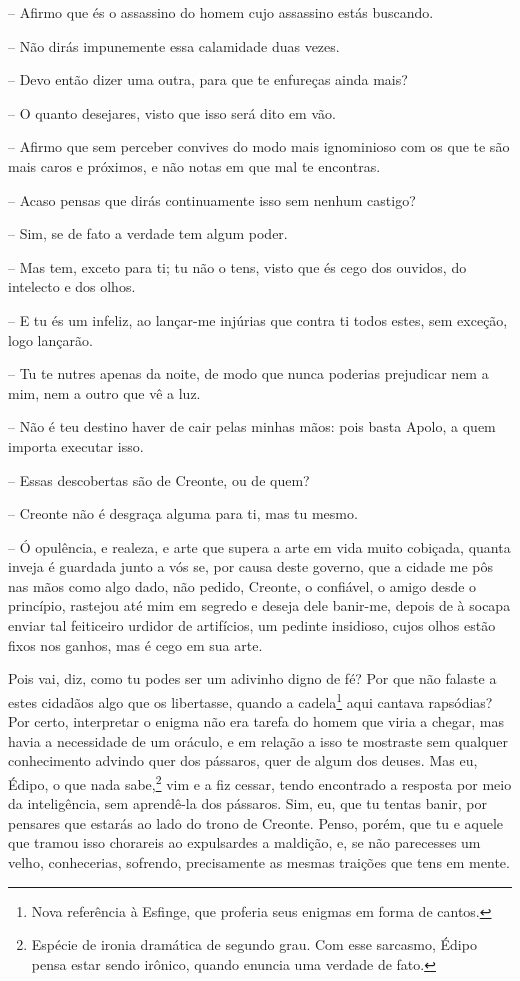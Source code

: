  --   Afirmo que és o assassino do homem cujo assassino estás buscando.

 --   Não dirás impunemente essa calamidade duas vezes.

 --   Devo então dizer uma outra, para que te enfureças ainda mais?

 --   O quanto desejares, visto que isso será dito em vão.

 --   Afirmo que sem perceber convives do modo mais ignominioso com os que te
são mais caros e próximos, e não notas em que mal te encontras.

 --   Acaso pensas que dirás continuamente isso sem nenhum castigo?

 --   Sim, se de fato a verdade tem algum poder.

 --    Mas tem, exceto para ti; tu não o tens, visto que és cego dos
ouvidos, do intelecto e dos olhos.

 --   E tu és um infeliz, ao lançar-me injúrias que contra ti todos estes, sem
exceção, logo lançarão.

 --   Tu te nutres apenas da noite, de modo que nunca poderias prejudicar nem
a mim, nem a outro que vê a luz.

 --   Não é teu destino haver de cair pelas minhas mãos: pois basta Apolo, a
quem importa executar isso.

 --   Essas descobertas são de Creonte, ou de quem?

 --   Creonte não é desgraça alguma para ti, mas tu mesmo.

 --    Ó opulência, e realeza, e arte que supera a arte em vida muito
cobiçada, quanta inveja é guardada junto a vós se, por causa deste
governo, que a cidade me pôs nas mãos como algo dado, não pedido,
Creonte, o confiável, o amigo desde o princípio, rastejou até mim em
segredo e deseja dele banir-me, depois de à socapa enviar tal feiticeiro
urdidor de artifícios, um pedinte insidioso, cujos olhos estão fixos nos
ganhos, mas é cego em sua arte.

 Pois vai, diz, como tu podes ser um adivinho digno de fé? Por que
não falaste a estes cidadãos algo que os libertasse, quando a
cadela\footnote{Nova referência à Esfinge, que proferia seus enigmas em
  forma de cantos.} aqui cantava rapsódias? Por certo, interpretar o
enigma não era tarefa do homem que viria a chegar, mas havia a
necessidade de um oráculo, e em relação a isso te mostraste sem qualquer
conhecimento advindo quer dos pássaros, quer de algum dos deuses. Mas
eu, Édipo, o que nada sabe,\footnote{Espécie de ironia dramática de
  segundo grau. Com esse sarcasmo, Édipo pensa estar sendo irônico,
  quando enuncia uma verdade de fato.} vim e a fiz cessar,
tendo encontrado a resposta por meio da inteligência, sem aprendê-la dos
pássaros. Sim, eu, que tu tentas banir, por pensares que estarás ao lado
do trono de  Creonte. Penso, porém, que tu e aquele que tramou isso
chorareis ao expulsardes a maldição, e, se não parecesses um velho,
conhecerias, sofrendo, precisamente as mesmas traições que tens em
mente.

